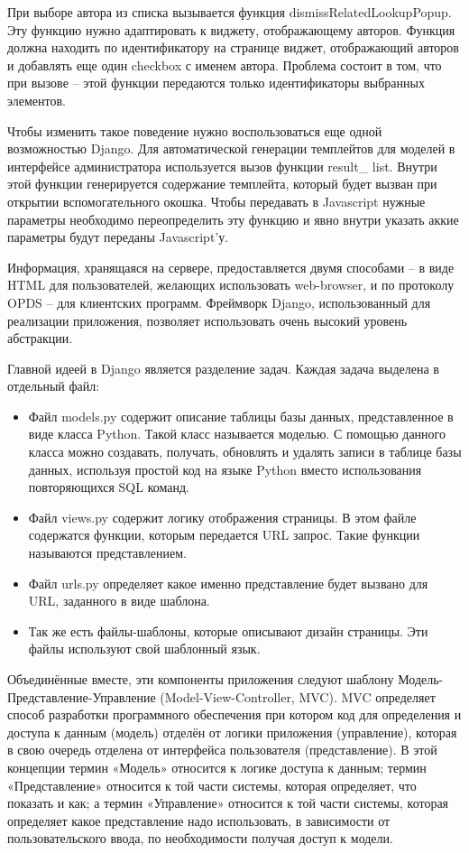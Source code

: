 \documentclass[a4paper]{report}
\begin{document}
При выборе автора из списка вызывается функция dismissRelatedLookupPopup. Эту функцию нужно адаптировать к виджету, отображающему авторов. Функция должна находить по идентификатору на странице виджет, отображающий авторов и добавлять еще один checkbox с именем автора. Проблема состоит в том, что при вызове -- этой функции передаются только идентификаторы выбранных элементов. 

Чтобы изменить такое поведение нужно воспользоваться еще одной возможностью Django. Для автоматической генерации темплейтов для моделей в интерфейсе администратора используется вызов функции result\_ list. Внутри этой функции генерируется содержание темплейта, который будет вызван при открытии вспомогательного окошка. Чтобы передавать в Javascript нужные параметры необходимо переопределить эту функцию и явно внутри указать аккие параметры будут переданы Javascript'у.



Информация, хранящаяся на сервере, предоставляется двумя способами -- в виде HTML для пользователей, желающих использовать web-browser, и по протоколу OPDS -- для клиентских программ. Фреймворк Django, использованный для реализации приложения, позволяет использовать очень высокий уровень абстракции.

Главной идеей в Django является разделение задач. Каждая задача выделена в отдельный файл:
\begin{itemize}
	\item Файл models.py содержит описание таблицы базы данных, представленное в виде класса Python. Такой класс называется моделью. С помощью данного класса можно создавать, получать, обновлять и удалять записи в таблице базы данных, используя простой код на языке Python вместо использования повторяющихся SQL команд.
	\item Файл views.py содержит логику отображения страницы. В этом файле содержатся функции, которым передается URL запрос. Такие функции называются представлением.
	\item Файл urls.py определяет какое именно представление будет вызвано для URL, заданного в виде шаблона. 
	\item Так же есть файлы-шаблоны, которые описывают дизайн страницы. Эти файлы используют свой шаблонный язык.
\end{itemize}

 Объединённые вместе, эти компоненты приложения следуют шаблону Модель-Представление-Управление  (Model-View-Controller, MVC). MVC определяет способ разработки программного обеспечения при котором код для определения и доступа к данным (модель) отделён от логики приложения (управление), которая в свою очередь отделена от интерфейса пользователя (представление). В этой концепции термин «Модель» относится к логике доступа к данным; термин «Представление» относится к той части системы, которая определяет, что показать и как; а термин «Управление» относится к той части системы, которая определяет какое представление надо использовать, в зависимости от пользовательского ввода, по необходимости получая доступ к модели. 
\end{document}
